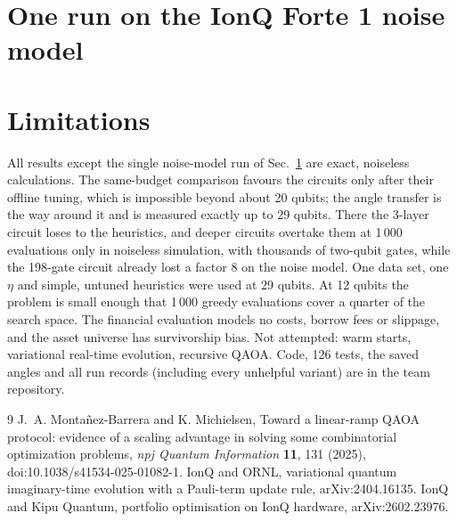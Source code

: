 \documentclass[10pt,twocolumn]{article}
\begin{document}
\section{One run on the IonQ Forte 1 noise model}\label{sec:ionq}


\section{Limitations}
All results except the single noise-model run of Sec.~\ref{sec:ionq} are exact, noiseless calculations. The same-budget comparison favours the circuits only after their offline tuning, which is impossible beyond about 20 qubits; the angle transfer is the way around it and is measured exactly up to 29 qubits. There the 3-layer circuit loses to the heuristics, and deeper circuits overtake them at 1\,000 evaluations only in noiseless simulation, with thousands of two-qubit gates, while the 198-gate circuit already lost a factor 8 on the noise model. One data set, one $\eta$ and simple, untuned heuristics were used at 29 qubits. At 12 qubits the problem is small enough that 1\,000 greedy evaluations cover a quarter of the search space. The financial evaluation models no costs, borrow fees or slippage, and the asset universe has survivorship bias. Not attempted: warm starts, variational real-time evolution, recursive QAOA. Code, 126 tests, the saved angles and all run records (including every unhelpful variant) are in the team repository.

\begin{thebibliography}{9}\footnotesize
{} J.~A. Monta\~nez-Barrera and K. Michielsen, Toward a linear-ramp QAOA protocol: evidence of a scaling advantage in solving some combinatorial optimization problems, \emph{npj Quantum Information} \textbf{11}, 131 (2025), doi:10.1038/s41534-025-01082-1.
 IonQ and ORNL, variational quantum imaginary-time evolution with a Pauli-term update rule, arXiv:2404.16135.
 IonQ and Kipu Quantum, portfolio optimisation on IonQ hardware, arXiv:2602.23976.
\end{thebibliography}
\end{document}
